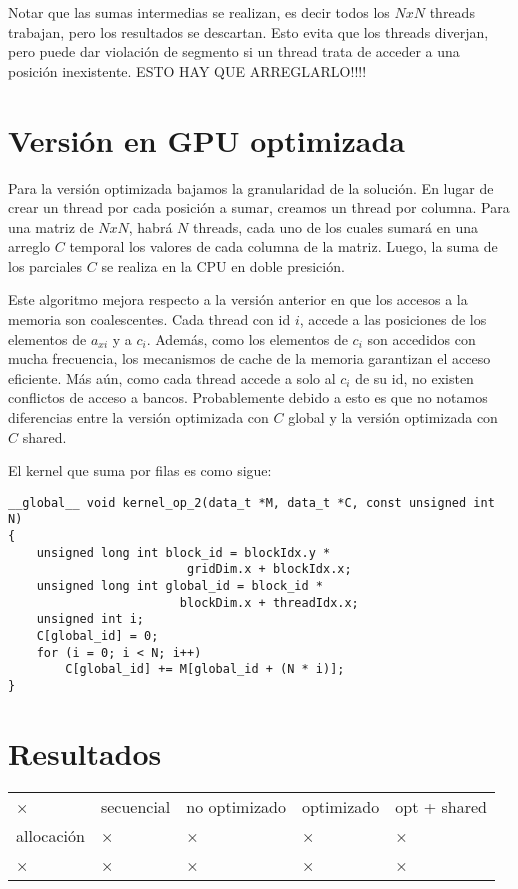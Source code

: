 \documentclass[a4paper,10pt]{article}
\begin{document}
Notar que las sumas intermedias se realizan, es decir todos los $NxN$ threads trabajan, pero los resultados se descartan. Esto evita que los threads diverjan, pero puede dar violación de segmento si un thread trata de acceder a una posición inexistente. ESTO HAY QUE ARREGLARLO!!!!

\section{Versión en GPU optimizada}
Para la versión optimizada bajamos la granularidad de la solución. En lugar de crear un thread por cada posición a sumar, creamos un thread por columna. Para una matriz de $NxN$, habrá $N$ threads, cada uno de los cuales sumará en una arreglo $C$ temporal los valores de cada columna de la matriz. Luego, la suma de los parciales $C$ se realiza en la CPU en doble presición. 

Este algoritmo mejora respecto a la versión anterior en que los accesos a la memoria son coalescentes. Cada thread con id $i$, accede a las posiciones de los elementos de $a_{xi}$ y a $c_i$. Además, como los elementos de $c_i$ son accedidos con mucha frecuencia, los mecanismos de cache de la memoria garantizan el acceso eficiente. Más aún, como cada thread accede a solo al $c_i$ de su id, no existen conflictos de acceso a bancos. Probablemente debido a esto es que no notamos diferencias entre la versión optimizada con $C$ global y la versión optimizada con $C$ shared.

El kernel que suma por filas es como sigue:

\begin{lstlisting}[frame=single]
__global__ void kernel_op_2(data_t *M, data_t *C, const unsigned int N)
{
    unsigned long int block_id = blockIdx.y *
                         gridDim.x + blockIdx.x;
    unsigned long int global_id = block_id * 
                        blockDim.x + threadIdx.x;
    unsigned int i;
    C[global_id] = 0;
    for (i = 0; i < N; i++)
        C[global_id] += M[global_id + (N * i)];
}
\end{lstlisting}


\section{Resultados}
\begin{center}
\begin{tabular}{lllll}
× & secuencial & no optimizado & optimizado & opt + shared\\
allocación & × & × & × & ×\\
× & × & × & × & ×
\end{tabular}
\end{center}
\end{document}
